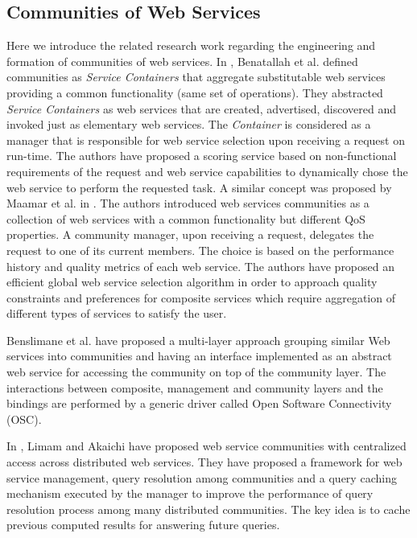 \subsection{Communities of Web Services}\label{sec:communities_rel}

Here we introduce the related research work regarding the engineering and formation
of communities of web services. In \cite{DBLP:journals/internet/BenatallahSD03}, Benatallah et al.
defined communities as \emph{Service Containers} that aggregate
substitutable web services providing a common functionality (same
set of operations). They abstracted \emph{Service Containers} as
web services that are created, advertised, discovered and invoked
just as elementary web services. The \emph{Container} is
considered as a manager that is responsible for web service
selection upon receiving a request on run-time. The authors have
proposed a scoring service based on non-functional requirements of
the request and web service capabilities to dynamically chose the
web service to perform the requested task. A similar concept was
proposed by Maamar et al. in
\cite{DBLP:journals/ijebr/MaamarSTBB09}. The authors introduced
web services communities as a collection of web services with a
common functionality but different QoS properties. A community
manager, upon receiving a request, delegates the request to one of
its current members. The choice is based on the performance
history and quality metrics of each web service. The authors have
proposed an efficient global web service selection algorithm in
order to approach quality constraints and preferences for
composite services which require aggregation of different types of
services to satisfy the user.

Benslimane et al. \cite{Liris-2770} have proposed a multi-layer
approach grouping similar Web services into communities and having
an interface implemented as an abstract web service for accessing
the community on top of the community layer. The interactions
between composite, management and community layers and the
bindings are performed by a generic driver called Open Software
Connectivity (OSC).

In \cite{managing-hela-jalel}, Limam and Akaichi have proposed web
service communities with centralized access across distributed web
services. They have proposed a framework for web service
management, query resolution among communities and a query caching
mechanism executed by the manager to improve the performance of
query resolution process among many distributed communities. The
key idea is to cache previous computed results for answering
future queries.


